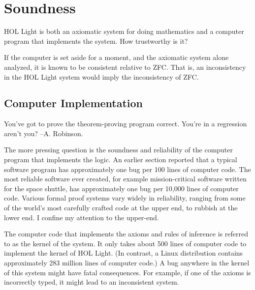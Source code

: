 \documentclass{llncs}
\begin{document}
\section{Soundness}

HOL Light is both an axiomatic system for doing mathematics and a computer program that implements the system.
How trustworthy is it?

If the computer is set aside for a moment, 
and the axiomatic system alone analyzed, it is known to be
consistent relative to ZFC.  That is, an inconsistency in
the HOL Light system would imply the inconsistency of ZFC. 



\subsection{Computer Implementation}

{\narrower\it  

You've got to prove the theorem-proving program correct. You're in a regression aren't you?
--A. Robinson.

}

\smallskip

The more pressing question is the soundness and reliability of the computer program that implements the
logic.  An earlier section reported that a typical software program has approximately one
bug per 100 lines of computer code.  The most reliable software ever created, for example
mission-critical software written for the space shuttle,
has approximately one bug per 10,000 lines of computer
code.  Various formal proof systems vary widely in reliability, ranging
from some of the world's most carefully crafted code at the upper end, to
rubbish at the lower end.  I  confine my attention to the
upper-end.


The computer code that implements the axioms and rules of inference is referred to as the kernel of the system.
It only takes about
500 lines of computer code to implement the kernel of HOL Light.  
(In contrast, a Linux distribution contains approximately
283 million lines of computer code.)
A bug anywhere in the kernel of this system might have fatal consequences.  For example,
if one of the axioms  is incorrectly typed, it might lead to an inconsistent system.
\end{document}
